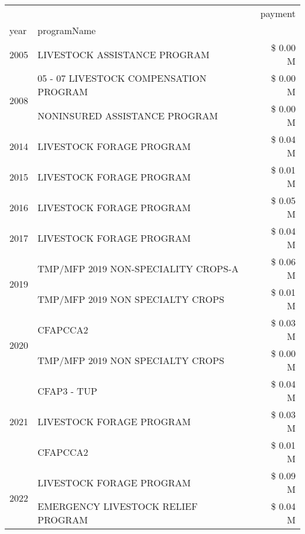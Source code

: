 \begin{tabular}{llr}
\toprule
 &  & payment \\
year & programName &  \\
\midrule
2005 & LIVESTOCK ASSISTANCE PROGRAM & \$ 0.00 M \\
\cline{1-3}
\multirow[t]{2}{*}{2008} & 05 - 07 LIVESTOCK COMPENSATION PROGRAM & \$ 0.00 M \\
 & NONINSURED ASSISTANCE PROGRAM & \$ 0.00 M \\
\cline{1-3}
2014 & LIVESTOCK FORAGE PROGRAM & \$ 0.04 M \\
\cline{1-3}
2015 & LIVESTOCK FORAGE PROGRAM & \$ 0.01 M \\
\cline{1-3}
2016 & LIVESTOCK FORAGE PROGRAM & \$ 0.05 M \\
\cline{1-3}
2017 & LIVESTOCK FORAGE PROGRAM & \$ 0.04 M \\
\cline{1-3}
\multirow[t]{2}{*}{2019} & TMP/MFP 2019 NON-SPECIALITY CROPS-A & \$ 0.06 M \\
 & TMP/MFP 2019 NON SPECIALTY CROPS & \$ 0.01 M \\
\cline{1-3}
\multirow[t]{2}{*}{2020} & CFAPCCA2 & \$ 0.03 M \\
 & TMP/MFP 2019 NON SPECIALTY CROPS & \$ 0.00 M \\
\cline{1-3}
\multirow[t]{3}{*}{2021} & CFAP3 - TUP & \$ 0.04 M \\
 & LIVESTOCK FORAGE PROGRAM & \$ 0.03 M \\
 & CFAPCCA2 & \$ 0.01 M \\
\cline{1-3}
\multirow[t]{2}{*}{2022} & LIVESTOCK FORAGE PROGRAM & \$ 0.09 M \\
 & EMERGENCY LIVESTOCK RELIEF PROGRAM & \$ 0.04 M \\
\cline{1-3}
\bottomrule
\end{tabular}

